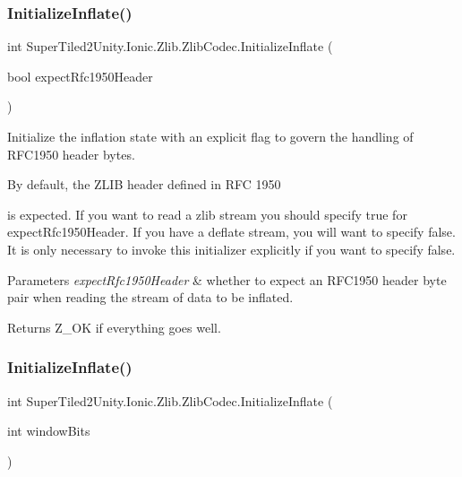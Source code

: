 \subsubsection{\texorpdfstring{Initialize\+Inflate()}{InitializeInflate()}\hspace{0.1cm}{\footnotesize\ttfamily [2/4]}}
{\footnotesize\ttfamily int Super\+Tiled2\+Unity.\+Ionic.\+Zlib.\+Zlib\+Codec.\+Initialize\+Inflate (\begin{DoxyParamCaption}\item[{bool}]{expect\+Rfc1950\+Header }\end{DoxyParamCaption})}



Initialize the inflation state with an explicit flag to govern the handling of R\+F\+C1950 header bytes. 

By default, the Z\+L\+IB header defined in R\+FC 1950

is expected. If you want to read a zlib stream you should specify true for expect\+Rfc1950\+Header. If you have a deflate stream, you will want to specify false. It is only necessary to invoke this initializer explicitly if you want to specify false. 


\begin{DoxyParams}{Parameters}
{\em expect\+Rfc1950\+Header} & whether to expect an R\+F\+C1950 header byte pair when reading the stream of data to be inflated.\\
\hline
\end{DoxyParams}


\begin{DoxyReturn}{Returns}
Z\+\_\+\+OK if everything goes well.
\end{DoxyReturn}
\mbox{\label{class_super_tiled2_unity_1_1_ionic_1_1_zlib_1_1_zlib_codec_a7e6db58967fbb7a5ed726aa8922e3406}} 
\subsubsection{\texorpdfstring{Initialize\+Inflate()}{InitializeInflate()}\hspace{0.1cm}{\footnotesize\ttfamily [3/4]}}
{\footnotesize\ttfamily int Super\+Tiled2\+Unity.\+Ionic.\+Zlib.\+Zlib\+Codec.\+Initialize\+Inflate (\begin{DoxyParamCaption}\item[{int}]{window\+Bits }\end{DoxyParamCaption})}



